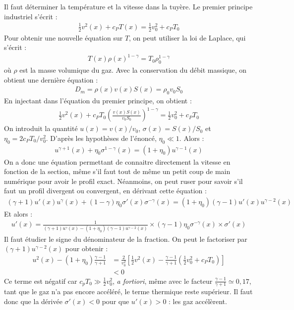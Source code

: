 \begin{correction}

Il faut déterminer la température et la vitesse dans la tuyère. Le premier principe industriel s'écrit :
\begin{align*}
	\frac{1}{2}v^2(x)+c_PT(x)=\frac{1}{2}v^2_0+c_PT_0
\end{align*}
Pour obtenir une nouvelle équation sur $T$, on peut utiliser la loi de Laplace, qui s'écrit :
\begin{align*}
T(x)\rho(x)^{1-\gamma}=T_0\rho_0^{1-\gamma}
\end{align*}
où $\rho$ est la masse volumique du gaz. Avec la conservation du débit massique, on obtient une dernière équation :
\begin{align*}
	D_m=\rho(x)v(x)S(x)=\rho_0v_0S_0
\end{align*}
En injectant dans l'équation du premier principe, on obtient :
\begin{align*}
	\frac{1}{2}v^2(x)+c_PT_0\left( \frac{v(x)S(x)}{v_0S_0}\right)^{1-\gamma}=\frac{1}{2}v^2_0+c_PT_0
\end{align*}
On introduit la quantité $u(x)=v(x)/v_0$, $\sigma(x)=S(x)/S_0$ et $\eta_0=2c_PT_0/v_0^2$. D'après les hypothèses de l'énoncé, $\eta_0\ll1$. Alors :
\begin{align*}
	u^{\gamma+1}(x)+\eta_0\sigma^{1-\gamma}(x)=(1+\eta_0)u^{\gamma-1}(x)
\end{align*}
On a donc une équation permettant de connaitre directement la vitesse en fonction de la section, même s'il faut tout de même un petit coup de main numérique pour avoir le profil exact. Néanmoins, on peut ruser pour savoir s'il faut un profil divergent ou convergent, en dérivant cette équation :
\begin{align*}
	(\gamma+1)u'(x)u^{\gamma}(x)+(1-\gamma)\eta_0\sigma'(x)\sigma^{-\gamma}(x)=(1+\eta_0)(\gamma-1)u'(x)u^{\gamma-2}(x)
\end{align*}
Et alors :
\begin{align*}
	u'(x)=\frac{1}{(\gamma+1)u^{\gamma}(x)-(1+\eta_0)(\gamma-1)u^{\gamma-2}(x)}\times(\gamma-1)\eta_0\sigma^{-\gamma}(x)\times\sigma'(x)
\end{align*}
Il faut étudier le signe du dénominateur de la fraction. On peut le factoriser par $(\gamma+1)u^{\gamma-2}(x)$ pour obtenir :
\begin{align*}
	u^{2}(x)-(1+\eta_0)\frac{\gamma-1}{\gamma+1}&= \frac{2}{v_0^2}\left[\frac{1}{2}v^{2}(x)-\frac{\gamma-1}{\gamma+1}\left( \frac{1}{2}v^{2}_0+c_PT_0\right) \right] \\
	&<0
\end{align*}
Ce terme est négatif car $c_pT_0\gg \frac{1}{2}v^{2}_0$, \textit{a fortiori}, même avec le facteur $\frac{\gamma-1}{\gamma+1}\simeq 0,17$, tant que le gaz n'a pas encore accéléré, le terme thermique reste supérieur. Il faut donc que la dérivée $\sigma'(x)<0$ pour que $u'(x)>0$ : les gaz accélèrent.

\end{correction}

